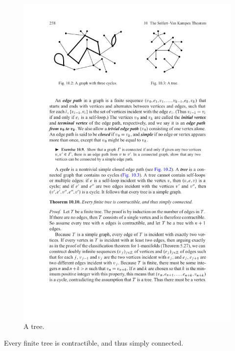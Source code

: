 \begin{figure}[htpb]
\begin{minipage}{200pt}
\includegraphics{Graph-eg2}
\caption{A tree.}
\end{minipage}
\end{figure}
\begin{proposition}\label{tree contractible}
Every finite tree is contractible, and thus simply connected.
\end{proposition}
